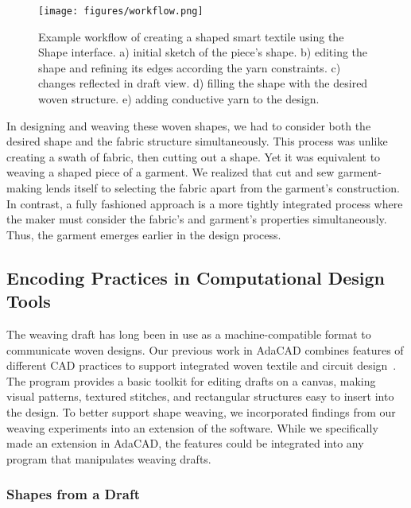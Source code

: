 \documentclass{sigchi}
\newcommand\shanel[1]{#1}
\begin{document}
\begin{figure*}[t!]
    \centering
    \texttt{[image: figures/workflow.png]}
    \vspace{-1em}
    \caption{Example workflow of creating a shaped smart textile using the Shape interface. a) initial sketch of the piece's shape. b) editing the shape and refining its edges according the yarn constraints. c) changes reflected in draft view. d) filling the shape with the desired woven structure. e) adding conductive yarn to the design.}
    \label{fig:draftDesign}
    \vspace{-1.5em}
\end{figure*}

\shanel{In designing and weaving these woven shapes, we had to consider both the desired shape and the fabric structure simultaneously. This process was unlike creating a swath of fabric, then cutting out a shape. Yet it was equivalent to weaving a shaped piece of a garment. We realized that cut and sew garment-making lends itself to selecting the fabric apart from the garment's construction. In contrast, a fully fashioned approach is a more tightly integrated process where the maker must consider the fabric's and garment's properties simultaneously. Thus, the garment emerges earlier in the design process.}

\subsection{Encoding Practices in Computational Design Tools}

The weaving draft has long been in use as a machine-compatible format to communicate woven designs. Our previous work in AdaCAD combines features of different CAD practices to support integrated woven textile and circuit design~\cite{friske_adacad:_2019}. The program provides a basic toolkit for editing drafts on a canvas, making visual patterns, textured stitches, and rectangular structures easy to insert into the design. To better support shape weaving, we incorporated findings from our weaving experiments into an extension of the software. While we specifically made an extension in AdaCAD, the features could be integrated into any program that manipulates weaving drafts.

\subsubsection{Shapes from a Draft}
\end{document}

